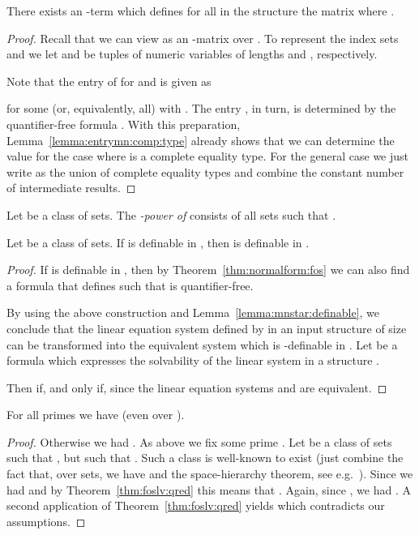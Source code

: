 \documentclass[a4paper,UKenglish]{lipics}
\theoremstyle{plain}
\begin{document}
\begin{lemma}\label{lemma:mnstar:definable}
There exists an -term  which defines for 
all  in the structure  the matrix  
where .
\end{lemma}

\begin{proof}
 Recall that we can view  as an -matrix over . To represent the index sets  
and  we let  and  be tuples of numeric variables of 
lengths  and , 
respectively.

Note that the entry  of 
for  and  is given as 

for some (or, equivalently, all)  with . The entry , in turn, is 
determined by the quantifier-free formula . With this preparation, 
Lemma~\ref{lemma:entrymn:comp:type} already shows that we can determine 
the value  for the case where  is 
a complete equality type. For the general case we just write  as 
the union of complete equality types and combine the constant number of 
intermediate results.
\end{proof}


\begin{definition}
 Let  be a class of sets. The 
\emph{-power  of } 
consists of all sets  such that .
\end{definition}


\begin{theorem}
\label{thm:foslv:qred}
 Let  be a class of sets. If  is 
definable in , then 
 is definable in .
\end{theorem}
\begin{proof}
 If  is definable in , then by 
Theorem~\ref{thm:normalform:fos} we can also find a formula  
that defines  such that 
 is quantifier-free. 

By using the above construction and Lemma~\ref{lemma:mnstar:definable}, 
we conclude that the linear equation system  
defined by  in an input structure  of size 
 can be transformed into the equivalent 
system  which is -definable in .
Let  be a formula which expresses the solvability of 
the linear system  in a structure .

Then  if, and only if,  since the 
linear equation systems  
and  are equivalent.
\end{proof}


\begin{theorem}
 For all primes  we have 
  (even over ).
\end{theorem}
\begin{proof}
 Otherwise we had . As above we fix some prime . 
Let  be a class of sets such that , but such that . Such a class  is 
well-known to exist (just combine the fact that, over sets, we have 
 and the space-hierarchy 
theorem, see e.g.~\cite{Pa95}). Since  we had  and by Theorem~\ref{thm:foslv:qred} this means that . Again, since , we had . A second 
application of Theorem~\ref{thm:foslv:qred} yields  
which contradicts our assumptions.
\end{proof}
\end{document}
